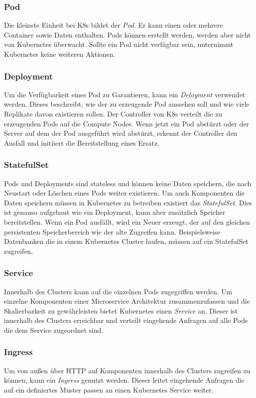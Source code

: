 \subsubsection{Pod}
Die kleinste Einheit bei K8s bildet der \textit{Pod}.
Er kann einen oder mehrere Container sowie Daten enthalten.
Pods können erstellt werden, werden aber nicht von Kubernetes überwacht.
Sollte ein Pod nicht verfügbar sein, unternimmt Kubernetes keine weiteren Aktionen.

\subsubsection{Deployment}
Um die Verfügbarkeit eines Pod zu Garantieren, kann ein \textit{Deloyment} verwendet werden.
Dieses beschreibt, wie der zu erzeugende Pod aussehen soll und wie viele Replikate davon existieren sollen.
Der Controller von K8s verteilt die zu erzeugenden Pods auf die Compute Nodes.
Wenn jetzt ein Pod abstürzt oder der Server auf dem der Pod ausgeführt wird abstürzt, erkennt der Controller den Ausfall und initiiert die Bereitstellung eines Ersatz.

\subsubsection{StatefulSet}
Pods und Deployments sind stateless und können keine Daten speichern, die nach Neustart oder Löschen eines Pods weiter existieren.
Um auch Komponenten die Daten speichern müssen in Kubernetes zu betreiben existiert das \textit{StatefulSet}.
Dies ist genauso aufgebaut wie ein Deployment, kann aber zusätzlich Speicher bereitstellen.
Wenn ein Pod ausfällt, wird ein Neuer erzeugt, der auf den gleichen persistenten Speicherbereich wie der alte Zugreifen kann.
Beispielsweise Datenbanken die in einem Kubernetes Cluster laufen, müssen auf ein StatefulSet zugreifen.

\subsubsection{Service}
Innerhalb des Clusters kann auf die einzelnen Pods zugegriffen werden.
Um einzelne Komponenten einer Microservice Architektur zusammenzufassen und die Skalierbarkeit zu gewährleisten bietet Kubernetes einen \textit{Service} an.
Dieser ist innerhalb des Clusters erreichbar und verteilt eingehende Anfragen auf alle Pods die dem Service zugeordnet sind.

\subsubsection{Ingress}
Um von außen über HTTP auf Komponenten innerhalb des Clusters zugreifen zu können, kann ein \textit{Ingress} genutzt werden.
Dieser leitet eingehende Anfragen die auf ein definiertes Muster passen an einen Kubernetes Service weiter.


